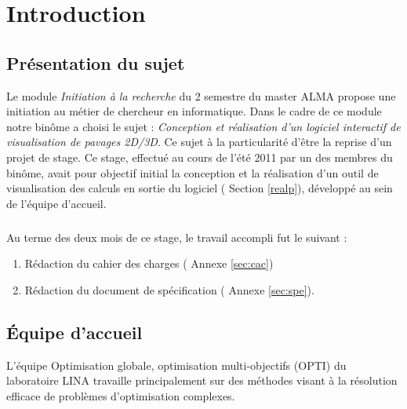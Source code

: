 \chapter{Introduction}

\section{Présentation du sujet}
Le module \emph{Initiation à la recherche} du 2 semestre du master \textsc{ALMA} propose une initiation au métier de chercheur en informatique. Dans le cadre de ce module notre binôme a choisi le sujet : \emph{Conception et réalisation d’un logiciel interactif de visualisation de pavages 2D/3D}. Ce sujet à la particularité d'être la reprise d'un projet de stage. Ce stage, effectué au cours de l'été 2011 par un des membres du binôme, avait pour objectif initial la conception et la réalisation d'un outil de visualisation des calculs en sortie du logiciel \realpaver (\cf{} Section \ref{realp}), développé au sein de l'équipe d'accueil.%

\paragraph{}
Au terme des deux mois de ce stage, le travail accompli fut le suivant :
\begin{enumerate}
\item 
Rédaction du cahier des charges (\cf{} Annexe \ref{sec:cac})
\item
Rédaction du document de spécification (\cf{} Annexe \ref{sec:spe}).
\end{enumerate} 



\section{Équipe d'accueil}
L'équipe Optimisation globale, optimisation multi-objectifs\cite{opti} (\textsc{OPTI}) du laboratoire \textsc{LINA}\cite{lina} travaille principalement sur des méthodes visant à la résolution efficace de problèmes d’optimisation complexes.  

